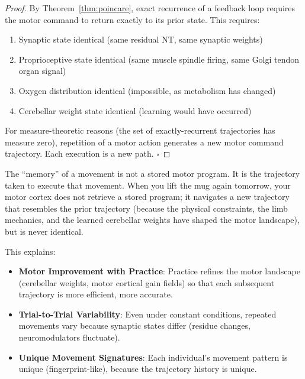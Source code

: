 \begin{proof}
By Theorem~\ref{thm:poincare}, exact recurrence of a feedback loop requires the motor command to return exactly to its prior state. This requires:
\begin{enumerate}[noitemsep]
\item Synaptic state identical (same residual NT, same synaptic weights)
\item Proprioceptive state identical (same muscle spindle firing, same Golgi tendon organ signal)
\item Oxygen distribution identical (impossible, as metabolism has changed)
\item Cerebellar weight state identical (learning would have occurred)
\end{enumerate}

For measure-theoretic reasons (the set of exactly-recurrent trajectories has measure zero), repetition of a motor action generates a new motor command trajectory. Each execution is a new path. $\square$
\end{proof}

\begin{corollary}
\label{cor:motor-memory}
The ``memory'' of a movement is not a stored motor program. It is the trajectory taken to execute that movement. When you lift the mug again tomorrow, your motor cortex does not retrieve a stored program; it navigates a new trajectory that resembles the prior trajectory (because the physical constraints, the limb mechanics, and the learned cerebellar weights have shaped the motor landscape), but is never identical.

This explains:
\begin{itemize}[noitemsep]
\item \textbf{Motor Improvement with Practice}: Practice refines the motor landscape (cerebellar weights, motor cortical gain fields) so that each subsequent trajectory is more efficient, more accurate.
\item \textbf{Trial-to-Trial Variability}: Even under constant conditions, repeated movements vary because synaptic states differ (residue changes, neuromodulators fluctuate).
\item \textbf{Unique Movement Signatures}: Each individual's movement pattern is unique (fingerprint-like), because the trajectory history is unique.
\end{itemize}
\end{corollary}

